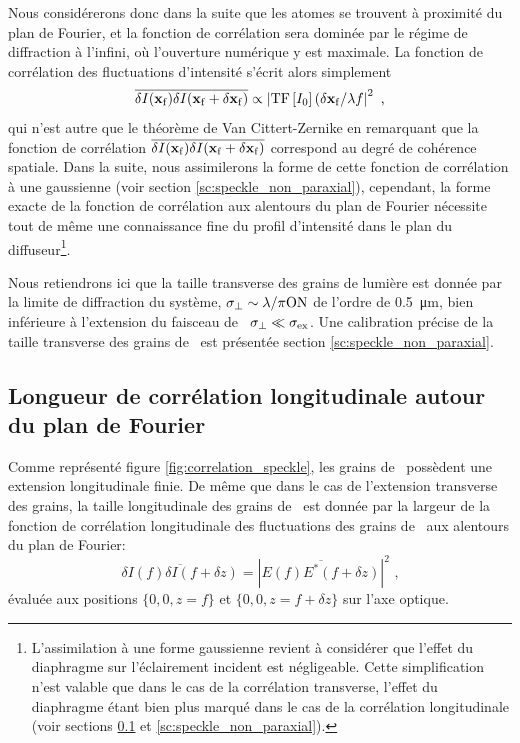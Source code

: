 Nous considérerons donc dans la suite que les atomes se trouvent à proximité du plan de Fourier, et la fonction de corrélation sera dominée par le régime de diffraction à l'infini, où l'ouverture numérique y est maximale. La fonction de corrélation des fluctuations d'intensité s'écrit alors simplement
\begin{equation}
\overline{\delta I (\mathbf{x}_{\mathrm{f}}) \delta I (\mathbf{x}_{\mathrm{f}} + \delta \mathbf{x}_{\mathrm{f}})} \propto \left| \mathrm{TF} \left[ I_0 \right] (\delta \mathbf{x}_{\mathrm{f}} / \lambda f \right| ^2 \text{ ,}
\end{equation}
qui n'est autre que le théorème de Van Cittert-Zernike en remarquant que la fonction de corrélation $\overline{\delta I(\mathbf{x}_{\mathrm{f}})\delta I(\mathbf{x}_{\mathrm{f}}+\delta\mathbf{x}_{\mathrm{f}})}$ correspond au degré de cohérence spatiale.
Dans la suite, nous assimilerons la forme de cette fonction de corrélation à une gaussienne (voir section \ref{sc:speckle_non_paraxial}), cependant, la forme exacte de la fonction de corrélation aux alentours du plan de Fourier nécessite tout de même une connaissance fine du profil d'intensité dans le plan du diffuseur\footnote{L'assimilation à une forme gaussienne revient à considérer que l'effet du diaphragme sur l'éclairement incident est négligeable. Cette simplification n'est valable que dans le cas de la corrélation transverse, l'effet du diaphragme étant bien plus marqué dans le cas de la corrélation longitudinale (voir sections \ref{sc:correlation_longitudinale} et \ref{sc:speckle_non_paraxial}).}. 

Nous retiendrons ici que la taille transverse des grains de lumière est donnée par la limite de diffraction du système, $\sigma_{\perp}\sim \lambda/\pi\mathrm{ON}$ de l'ordre de \SI{0.5}{\micro\metre}, bien inférieure à l'extension du faisceau de \speckle\ $\sigma_{\perp} \ll \sigma_{\mathrm{ex}}$. Une calibration précise de la taille transverse des grains de \speckle\ est présentée section \ref{sc:speckle_non_paraxial}.




\subsection{Longueur de corrélation longitudinale autour du plan de Fourier}
\label{sc:correlation_longitudinale}
Comme représenté figure \ref{fig:correlation_speckle}, les grains de \speckle\ possèdent une extension longitudinale finie. De même que dans le cas de l'extension transverse des grains, la taille longitudinale des grains de \speckle\ est donnée par la largeur de la fonction de corrélation longitudinale des fluctuations des grains de \speckle\ aux alentours du plan de Fourier:
\begin{equation}
\overline{\delta I(f) \delta I( f + \delta z)}=\left| \overline{E(f) E^*(f+\delta z)} \right|^2 \text{ ,}
\label{eq:correlation_intensite_longitudinale}
\end{equation}
évaluée aux positions $\lbrace 0,0,z=f \rbrace$ et $\lbrace 0,0,z=f+\delta z \rbrace$ sur l'axe optique.

